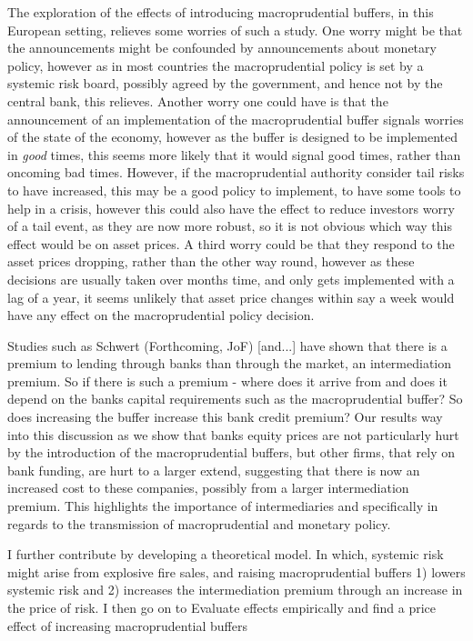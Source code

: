 \documentclass[11pt]{article}
\begin{document}
The exploration of the effects of introducing macroprudential buffers, in this European setting, relieves some worries of such a study. One worry might be that the announcements might be confounded by announcements about monetary policy, however as in most countries the macroprudential policy is set by a systemic risk board, possibly agreed by the government, and hence not by the central bank, this relieves. Another worry one could have is that the announcement of an implementation of the macroprudential buffer signals worries of the state of the economy, however as the buffer is designed to be implemented in \emph{good} times, this seems more likely that it would signal good times, rather than oncoming bad times. However, if the macroprudential authority consider tail risks to have increased, this may be a good policy to implement, to have some tools to help in a crisis, however this could also have the effect to reduce investors worry of a tail event, as they are now more robust, so it is not obvious which way this effect would be on asset prices. A third worry could be that they respond to the asset prices dropping, rather than the other way round, however as these decisions are usually taken over months time, and only gets implemented with a lag of a year, it seems unlikely that asset price changes within say a week would have any effect on the macroprudential policy decision.

Studies such as Schwert (Forthcoming, JoF) [and...] have shown that there is a premium to lending through banks than through the market, an intermediation premium. So if there is such a premium - where does it arrive from and does it depend on the banks capital requirements such as the macroprudential buffer? So does increasing the buffer increase this bank credit premium? Our results way into this discussion as we show that banks equity prices are not particularly hurt by the introduction of the macroprudential buffers, but other firms, that rely on bank funding, are hurt to a larger extend, suggesting that there is now an increased cost to these companies, possibly from a larger intermediation premium. This highlights the importance of intermediaries and specifically in regards to the transmission of macroprudential and monetary policy.

I further contribute by developing a theoretical model. In which, systemic risk might arise from explosive fire sales, and raising macroprudential buffers 1) lowers systemic risk and 2) increases the intermediation premium through an increase in the price of risk. I then go on to Evaluate effects empirically and find a price effect of increasing macroprudential buffers
\end{document}
